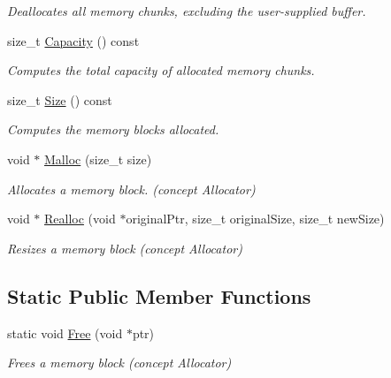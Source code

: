 \begin{DoxyCompactItemize}
\begin{DoxyCompactList}\small\item\em Deallocates all memory chunks, excluding the user-\/supplied buffer. \end{DoxyCompactList}\item 
size\+\_\+t \hyperlink{class_memory_pool_allocator_ac4738338f038d040641f23aa7955e2d3}{Capacity} () const 
\begin{DoxyCompactList}\small\item\em Computes the total capacity of allocated memory chunks. \end{DoxyCompactList}\item 
size\+\_\+t \hyperlink{class_memory_pool_allocator_a2ccb6c068b8b35dbc3680dc5563af2f4}{Size} () const 
\begin{DoxyCompactList}\small\item\em Computes the memory blocks allocated. \end{DoxyCompactList}\item 
void $\ast$ \hyperlink{class_memory_pool_allocator_a02f6832910453446cb77bf919ba49e99}{Malloc} (size\+\_\+t size)\hypertarget{class_memory_pool_allocator_a02f6832910453446cb77bf919ba49e99}{}\label{class_memory_pool_allocator_a02f6832910453446cb77bf919ba49e99}

\begin{DoxyCompactList}\small\item\em Allocates a memory block. (concept Allocator) \end{DoxyCompactList}\item 
void $\ast$ \hyperlink{class_memory_pool_allocator_aba75280d42184b0ad414243f7f5ac6c7}{Realloc} (void $\ast$original\+Ptr, size\+\_\+t original\+Size, size\+\_\+t new\+Size)\hypertarget{class_memory_pool_allocator_aba75280d42184b0ad414243f7f5ac6c7}{}\label{class_memory_pool_allocator_aba75280d42184b0ad414243f7f5ac6c7}

\begin{DoxyCompactList}\small\item\em Resizes a memory block (concept Allocator) \end{DoxyCompactList}\end{DoxyCompactItemize}
\subsection*{Static Public Member Functions}
\begin{DoxyCompactItemize}
\item 
static void \hyperlink{class_memory_pool_allocator_a6b180eb150451b4df8b70d827cd1191c}{Free} (void $\ast$ptr)\hypertarget{class_memory_pool_allocator_a6b180eb150451b4df8b70d827cd1191c}{}\label{class_memory_pool_allocator_a6b180eb150451b4df8b70d827cd1191c}

\begin{DoxyCompactList}\small\item\em Frees a memory block (concept Allocator) \end{DoxyCompactList}\end{DoxyCompactItemize}
